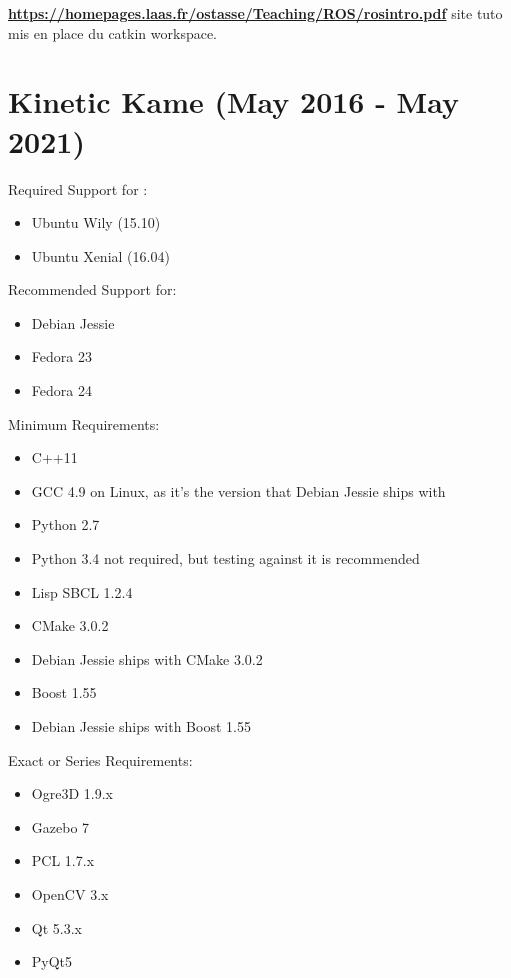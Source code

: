 \documentclass[a4paper]{report}
\begin{document}
    \textbf{\url{https://homepages.laas.fr/ostasse/Teaching/ROS/rosintro.pdf}} site tuto mis en place du catkin workspace.

    \section*{Kinetic Kame (May 2016 - May 2021)}
    \vspace{1cm}
    Required Support for :
    \begin{itemize}
        \item Ubuntu Wily (15.10)
        \item Ubuntu Xenial (16.04)
    \end{itemize}

    Recommended Support for:
    \begin{itemize}
        \item Debian Jessie
        \item Fedora 23
        \item Fedora 24
    \end{itemize}

    Minimum Requirements:
    \begin{itemize}
        \item C++11
        \item GCC 4.9 on Linux, as it's the version that Debian Jessie ships with
        \item Python 2.7
        \item Python 3.4 not required, but testing against it is recommended
        \item Lisp SBCL 1.2.4
        \item CMake 3.0.2
        \item Debian Jessie ships with CMake 3.0.2
        \item Boost 1.55
        \item Debian Jessie ships with Boost 1.55
    \end{itemize}

    \newpage

    Exact or Series Requirements:
    \begin{itemize}
        \item Ogre3D 1.9.x
        \item Gazebo 7
        \item PCL 1.7.x
        \item OpenCV 3.x
        \item Qt 5.3.x
        \item PyQt5
    \end{itemize}
\end{document}

